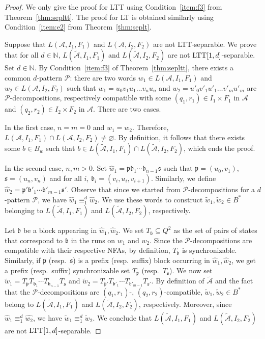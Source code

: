 \documentclass{LMCS}
\newcommand\nat{\ensuremath{\mathbb{N}}\xspace}
\newcommand\As{\ensuremath{\mathcal{A}}\xspace}
\newcommand\Ps{\ensuremath{\mathcal{P}}\xspace}
\newcommand{\lt}{\textup{LT}\xspace}
\newcommand{\ltt}{\textup{LTT}\xspace}
\newcommand\ltteq[2]{\ensuremath{\equiv_{#1}^{#2}}\xspace}
\newcommand\decops[1]{\ensuremath{#1}-decompositions\xspace}
\newcommand\pfsdecomps{\decops{\Ps}}
\newcommand\frb{\ensuremath{\mathfrak{b}}\xspace}
\newcommand\frp{\ensuremath{\mathfrak{p}}\xspace}
\newcommand\frs{\ensuremath{\mathfrak{s}}\xspace}
\theoremstyle{plain}
\begin{document}
\begin{proof}
  We only give the proof for \ltt using Condition~\eqref{item:f3} from
  Theorem~\ref{thm:sepltt}. The proof for \lt is obtained similarly
  using Condition~\eqref{item:e2} from Theorem~\ref{thm:seplt}.

  Suppose that $L(\As,I_1,F_1)$ and $L(\As,I_2,F_2)$ are not \ltt-separable. We prove that for
  all $d \in \nat$, $L(\widetilde{\As},I_1,F_1)$ and $L(\widetilde{\As},I_2,F_2)$ are not
  $\ltt[1,d]$-separable. Set $d \in \nat$. By Condition~\eqref{item:f3} 
  of Theorem~\ref{thm:sepltt}, there exists a common $d$-pattern \Ps:
  there are two words $w_1 \in L(\As,I_1,F_1)$ and $w_2 \in L(\As,I_2,F_2)$ such that $w_1 = u_0
  v_1 u_1 \ldots v_n u_n$ and $w_2 = u'_0 v'_1 u'_1 \ldots v'_m u'_m$ are
  \pfsdecomps, respectively compatible with some $(q_1,r_1)\in I_1\times F_1$ in
  $\As$ and $(q_2,r_2)\in I_2\times F_2$ in $\As$. There
  are two cases.

  In the first case, $n=m=0$ and $w_1=w_2$. Therefore, $L(\As,I_1,F_1) \cap
  L(\As,I_2,F_2) \ne \varnothing$. By definition, it follows that there exists
  some $b \in B_w$ such that $b \in L(\widetilde{\As},I_1,F_1) \cap
  L(\widetilde{\As},I_2,F_2)$, which ends the proof.

  In the second case, $n,m > 0$. Set $\widehat{w}_1 = \frp\frb_1 \cdots
  \frb_{n-1}\frs$ such that $\frp=(u_0,v_1)$, $\frs=(u_n,v_n)$ and for
  all $i$, $\frb_i =(v_i,u_i,v_{i+1})$. Similarly, we define $\widehat{w}_2 =
  \frp' \frb'_1 \cdots \frb'_{m-1}\frs'$. Observe that since we started
  from \pfsdecomps for a $d$-pattern \Ps, we have $\widehat{w}_1
  \ltteq{1}{d} \widehat{w}_2$. We use these words to construct $\widetilde{w}_1,
  \widetilde{w}_2 \in B^*$ belonging to $L(\widetilde{\As},I_1,F_1)$ and
  $L(\widetilde{\As},I_2,F_2)$, respectively.

  Let $\frb$ be a block appearing in $\widehat{w}_1,\widehat{w}_2$. We set
  $T_\frb \subseteq Q^2$ as the set of pairs of states
  that correspond to $\frb$ in the runs on $w_1$ and $w_2$. Since the
  \pfsdecomps are compatible with their respective NFAs, by definition,
  $T_\frb$ is synchronizable. Similarly, if $\frp$ (resp.~$\frs$) is a
  prefix (resp.~suffix) block occurring in $\widehat{w}_1,\widehat{w}_2$, we get
  a prefix (resp.~suffix) synchronizable set $T_\frp$ (resp.~$T_\frs$).
  We now set $\widetilde{w}_1=T_\frp T_{\frb_1} \cdots T_{\frb_{n-1}}
  T_\frs$ and $\widetilde{w}_2 = T_{\frp'} T_{\frb'_1} \cdots
  T_{\frb'_{m-1}}T_{\frs'}$. By definition of $\widetilde{\As}$
  and the fact that the \pfsdecomps are  $(q_1,r_1)$-, $(q_2,r_2)$-compatible,
  $\widetilde{w}_1,\widetilde{w}_2 \in B^*$ belong to  $L(\widetilde{\As},I_1,F_1)$ and
  $L(\widetilde{\As},I_2,F_2)$, respectively. Moreover, since $\widehat{w}_1 \ltteq{1}{d} \hat{w_2}$,
  we have $\widetilde{w}_1 \ltteq{1}{d} \widetilde{w}_2$. We conclude that
  $L(\widetilde{\As},I_1,F_1)$ and $L(\widetilde{\As},I_2,F_2)$ are not $\ltt[1,d]$-separable.


\end{proof}
\end{document}
